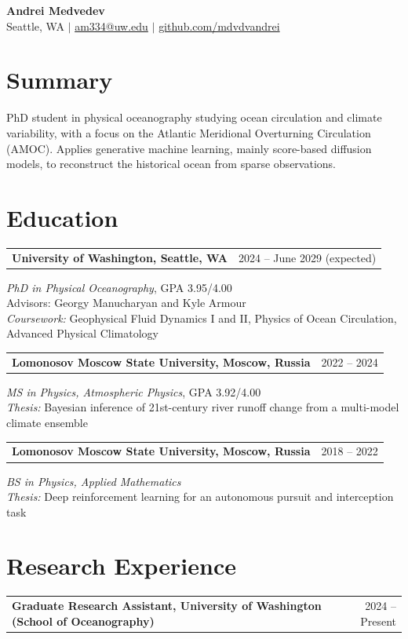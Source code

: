 \documentclass[letterpaper,10pt]{article}
\makeatletter
\newcommand{\entry}[2]{%
  \noindent\begin{tabularx}{\textwidth}{@{}X r@{}}%
    \textbf{#1} & #2 \\
  \end{tabularx}\par\nopagebreak
}
\makeatother
\begin{document}
\begin{center}
    {\LARGE\textbf{Andrei Medvedev}}\\[5pt]
    Seattle, WA
    \quad $|$ \quad
    \href{mailto:am334@uw.edu}{am334@uw.edu}
    \quad $|$ \quad
    \href{https://github.com/mdvdvandrei}{github.com/mdvdvandrei}
\end{center}

\section{Summary}
PhD student in physical oceanography studying ocean circulation and climate variability, with a focus on the Atlantic Meridional Overturning Circulation (AMOC). Applies generative machine learning, mainly score-based diffusion models, to reconstruct the historical ocean from sparse observations.

\section{Education}

\entry{University of Washington, Seattle, WA}{2024 -- June 2029 (expected)}
\textit{PhD in Physical Oceanography}, GPA 3.95/4.00\\
Advisors: Georgy Manucharyan and Kyle Armour\\
\textit{Coursework:} Geophysical Fluid Dynamics I and II, Physics of Ocean Circulation, Advanced Physical Climatology

\smallskip
\entry{Lomonosov Moscow State University, Moscow, Russia}{2022 -- 2024}
\textit{MS in Physics, Atmospheric Physics}, GPA 3.92/4.00\\
\textit{Thesis:} Bayesian inference of 21st-century river runoff change from a multi-model climate ensemble

\smallskip
\entry{Lomonosov Moscow State University, Moscow, Russia}{2018 -- 2022}
\textit{BS in Physics, Applied Mathematics}\\
\textit{Thesis:} Deep reinforcement learning for an autonomous pursuit and interception task

\section{Research Experience}

\entry{Graduate Research Assistant, University of Washington \textnormal{(School of Oceanography)}}{2024 -- Present}
\end{document}
